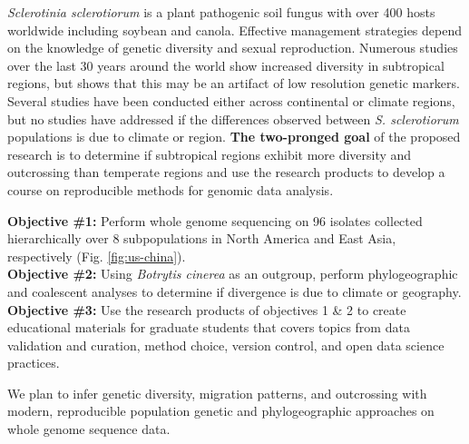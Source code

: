 \documentclass[12pt,letterpaper]{article}
\begin{document}

\textit{Sclerotinia sclerotiorum} is a plant pathogenic soil fungus with over 400 hosts worldwide including soybean and canola. 
Effective management strategies depend on the knowledge of genetic diversity and sexual reproduction.
Numerous studies over the last 30 years around the world show increased diversity in subtropical regions, but \cite{lehner2017sclerotinia} shows that this may be an artifact of low resolution genetic markers.
Several studies have been conducted either across continental or climate regions, but no studies have addressed if the differences observed between \textit{S. sclerotiorum} populations is due to climate or region. 
\textbf{The two-pronged goal} of the proposed research is to determine if subtropical regions exhibit more diversity and outcrossing than temperate regions and use the research products to develop a course on reproducible methods for genomic data analysis.

\noindent
\textbf{Objective \#1:} Perform whole genome sequencing on 96 isolates collected hierarchically over 8 subpopulations in North America and East Asia, respectively (Fig. \ref{fig:us-china}).\\
\textbf{Objective \#2:} Using \textit{Botrytis cinerea} as an outgroup, perform phylogeographic and coalescent analyses to determine if divergence is due to climate or geography.\\
\textbf{Objective \#3:} Use the research products of objectives 1 \& 2 to create educational materials for graduate students that covers topics from
data validation and curation, method choice, version control, and open data science practices.

We plan to infer genetic diversity, migration patterns, and outcrossing with modern, reproducible population genetic and phylogeographic approaches on whole genome sequence data. 
\end{document}
